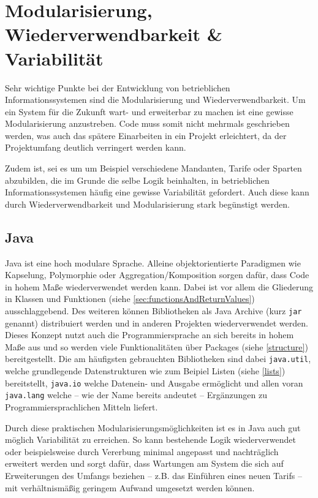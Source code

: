 \section{Modularisierung, Wiederverwendbarkeit \& Variabilität}\label{wiederverwendbarkeit}
Sehr wichtige Punkte bei der Entwicklung von betrieblichen Informationssystemen sind die Modularisierung und Wiederverwendbarkeit. Um ein System für die Zukunft wart- und erweiterbar zu machen ist eine gewisse Modularisierung anzustreben. Code muss somit nicht mehrmals geschrieben werden, was auch das spätere Einarbeiten in ein Projekt erleichtert, da der Projektumfang deutlich verringert werden kann. 

Zudem ist, sei es um um Beispiel verschiedene Mandanten, Tarife oder Sparten abzubilden, die im Grunde die selbe Logik beinhalten, in betrieblichen Informationssystemen häufig eine gewisse Variabilität gefordert. Auch diese kann durch Wiederverwendbarkeit und Modularisierung stark begünstigt werden.

\subsection*{Java}
Java ist eine hoch modulare Sprache. Alleine objektorientierte Paradigmen wie Kapselung, Polymorphie oder Aggregation/Komposition sorgen dafür, dass Code in hohem Maße wiederverwendet werden kann. Dabei ist vor allem die Gliederung in Klassen und Funktionen (siehe \autoref{sec:functionsAndReturnValues}) ausschlaggebend. Des weiteren können Bibliotheken als Java Archive (kurz \texttt{jar} genannt) dis­tri­bu­ie­rt werden und in anderen Projekten wiederverwendet werden. Dieses Konzept nutzt auch die Programmiersprache an sich bereits in hohem Maße aus und so werden viele Funktionalitäten über Packages (siehe \autoref{structure}) bereitgestellt. Die am häufigsten gebrauchten Bibliotheken sind dabei \texttt{java.util}, welche grundlegende Datenstrukturen wie zum Beipiel Listen (siehe \autoref{lists}) bereitstellt, \texttt{java.io} welche Datenein- und Ausgabe ermöglicht und allen voran \texttt{java.lang} welche -- wie der Name bereits andeutet -- Ergänzungen zu Programmiersprachlichen Mitteln liefert. 

Durch diese praktischen Modularisierungsmöglichkeiten ist es in Java auch gut möglich Variabilität zu erreichen. So kann bestehende Logik wiederverwendet oder beispielsweise durch Vererbung minimal angepasst und nachträglich erweitert werden und sorgt dafür, dass Wartungen am System die sich auf Erweiterungen des Umfangs beziehen -- z.B. das Einführen eines neuen Tarifs -- mit verhältnismäßig geringem Aufwand umgesetzt werden können.

